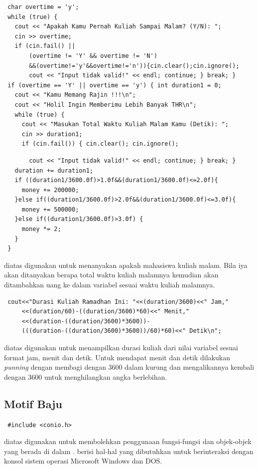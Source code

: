 \documentclass[../main.tex]{subfiles}
\begin{document}
\begin{lstlisting}
 char overtime = 'y';
 while (true) {
   cout << "Apakah Kamu Pernah Kuliah Sampai Malam? (Y/N): ";
   cin >> overtime;
   if (cin.fail() ||
       (overtime != 'Y' && overtime != 'N')
       &&(overtime!='y'&&overtime!='n')){cin.clear();cin.ignore();
       cout << "Input tidak valid!" << endl; continue; } break; }
 if (overtime == 'Y' || overtime == 'y') { int duration1 = 0;
   cout << "Kamu Memang Rajin !!!\n";
   cout << "Holil Ingin Memberimu Lebih Banyak THR\n";
   while (true) {
     cout << "Masukan Total Waktu Kuliah Malam Kamu (Detik): ";
     cin >> duration1;
     if (cin.fail()) { cin.clear(); cin.ignore();
\end{lstlisting}
\begin{lstlisting}
       cout << "Input tidak valid!" << endl; continue; } break; }
   duration += duration1;
   if ((duration1/3600.0f)>1.0f&&(duration1/3600.0f)<=2.0f){
     money += 200000;
   }else if((duration1/3600.0f)>2.0f&&(duration1/3600.0f)<=3.0f){
     money += 500000;
   }else if((duration1/3600.0f)>3.0f) {
     money *= 2;
   }
 }
\end{lstlisting}
    \vspace{-0.25ex}
    \ilz{}{\Script} diatas digunakan untuk menanyakan apakah mahasiswa kuliah malam. Bila iya akan ditanyakan berapa total waktu kuliah malamnya kemudian akan ditambahkan uang ke dalam variabel  sesuai waktu kuliah malamnya.

    \vspace{-0.25ex}
\begin{lstlisting}
 cout<<"Durasi Kuliah Ramadhan Ini: "<<(duration/3600)<<" Jam,"
     <<(duration/60)-((duration/3600)*60)<<" Menit,"
     <<(duration-((duration/3600)*3600))-
     (((duration-((duration/3600)*3600))/60)*60)<<" Detik\n";
\end{lstlisting}
    \vspace{-0.25ex}
    \ilz{}{\Script} diatas digunakan untuk menampilkan durasi kuliah dari nilai variabel  sesuai format jam, menit dan detik. Untuk mendapat menit dan detik dilakukan {\type} \textit{punning} dengan membagi  dengan 3600 dalam kurung dan mengalikannya kembali dengan 3600 untuk menghilangkan angka berlebihan.

    \subsection{Motif Baju}
\begin{lstlisting}
 #include <conio.h> 
\end{lstlisting}
    \vspace{-0.25ex}
    \ilz{}{\Script} diatas digunakan untuk membolehkan penggunaan fungsi-fungsi dan objek-objek yang berada di dalam {\header} {\file} . {\Header} {\file}  berisi hal-hal yang dibutuhkan untuk berinteraksi dengan konsol sistem operasi Microsoft Windows dan DOS.
\end{document}
